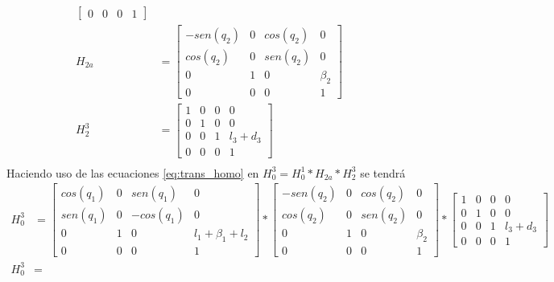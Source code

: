 \documentclass[12pt]{article}
\begin{document}
\begin{enumerate}
\begin{equation}
\begin{split}
\begin{bmatrix}
                0&0&0&1
            \end{bmatrix}\\
            H_{2a}&=
            \begin{bmatrix}
                -sen(q_2)&0&cos(q_2)& 0\\
                cos(q_2)&0&sen(q_2)&0\\
                0&1&0&\beta_2\\
                0&0&0&1
            \end{bmatrix}\\
            H_2^3&=
            \begin{bmatrix}
                1&0&0&0\\
                0&1&0&0\\
                0&0&1&l_3+d_3\\
                0&0&0&1
            \end{bmatrix}\\
        \end{split}
        \label{eq:trans_homo}
    \end{equation}
    Haciendo uso de las ecuaciones \ref{eq:trans_homo} en $H_0^3=H_0^1*H_{2a}*H_2^3$ se tendrá
    \begin{equation}
        \begin{split}
            H_0^3&=
            \begin{bmatrix}
                cos(q_1)&0 & sen(q_1)& 0\\
                sen(q_1)&0&-cos(q_1)&0\\
                0&1&0&l_1+\beta_1+l_2\\
                0&0&0&1
            \end{bmatrix}*
            \begin{bmatrix}
                -sen(q_2)&0&cos(q_2)& 0\\
                cos(q_2)&0&sen(q_2)&0\\
                0&1&0&\beta_2\\
                0&0&0&1
            \end{bmatrix}*
            \begin{bmatrix}
                1&0&0&0\\
                0&1&0&0\\
                0&0&1&l_3+d_3\\
                0&0&0&1
            \end{bmatrix}\\
            H_0^3&=

\end{split}
\end{equation}
\end{enumerate}
\end{document}
